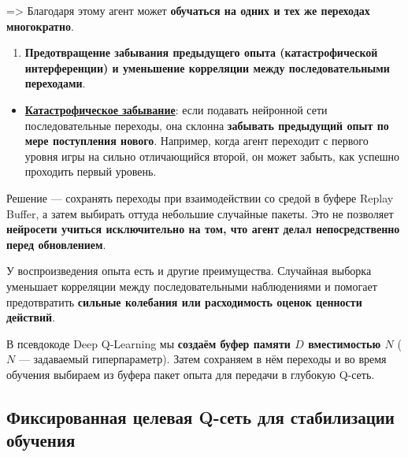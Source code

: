 \documentclass[11pt,a4paper]{article}
\begin{document}

=\textgreater{} Благодаря этому агент может \textbf{обучаться на одних и тех же переходах многократно}.

\begin{enumerate}
\def\labelenumi{\arabic{enumi}.}
\setcounter{enumi}{1}
\tightlist
\item
\textbf{Предотвращение забывания предыдущего опыта (катастрофической интерференции) и уменьшение корреляции между последовательными переходами}.
\end{enumerate}

\begin{itemize}
\tightlist
\item
\textbf{\href{https://en.wikipedia.org/wiki/Catastrophic_interference}{Катастрофическое забывание}}: если подавать нейронной сети последовательные переходы, она склонна \textbf{забывать предыдущий опыт по мере поступления нового}. Например, когда агент переходит с первого уровня игры на сильно отличающийся второй, он может забыть, как успешно проходить первый уровень.
\end{itemize}

Решение --- сохранять переходы при взаимодействии со средой в буфере Replay Buffer, а затем выбирать оттуда небольшие случайные пакеты. Это не позволяет \textbf{нейросети учиться исключительно на том, что агент делал непосредственно перед обновлением}.

У воспроизведения опыта есть и другие преимущества. Случайная выборка уменьшает корреляции между последовательными наблюдениями и помогает предотвратить \textbf{сильные колебания или расходимость оценок ценности действий}.

В псевдокоде Deep Q-Learning мы \textbf{создаём буфер памяти \(D\) вместимостью \(N\)} (\(N\) --- задаваемый гиперпараметр). Затем сохраняем в нём переходы и во время обучения выбираем из буфера пакет опыта для передачи в глубокую Q-сеть.


\subsection{Фиксированная целевая Q-сеть для стабилизации обучения}\label{fixed-q-target-to-stabilize-the-training}
\end{document}

